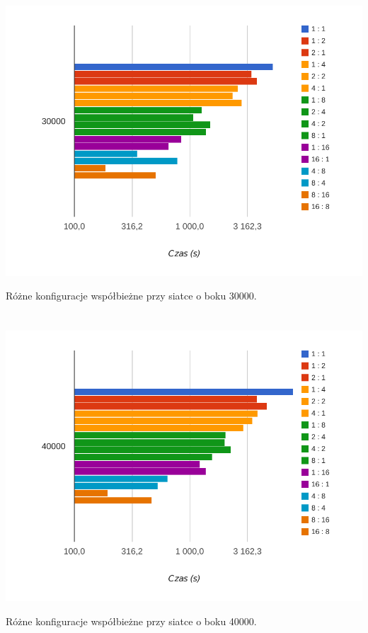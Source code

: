 \documentclass[paper=a4, fontsize=11pt]{scrartcl}	%
\numberwithin{equation}{section}		%
\numberwithin{figure}{section}			%
\numberwithin{table}{section}				%
\begin{document}
\begin{center}
\includegraphics[width=135mm]{report/time-30000.pdf}

Różne konfiguracje współbieżne przy siatce o boku 30000.
\\ \ \\ \ \\


\includegraphics[width=135mm]{report/time-40000.pdf}

Różne konfiguracje współbieżne przy siatce o boku 40000.
\\ \ \\ \ \\

\end{center}
\end{document}
